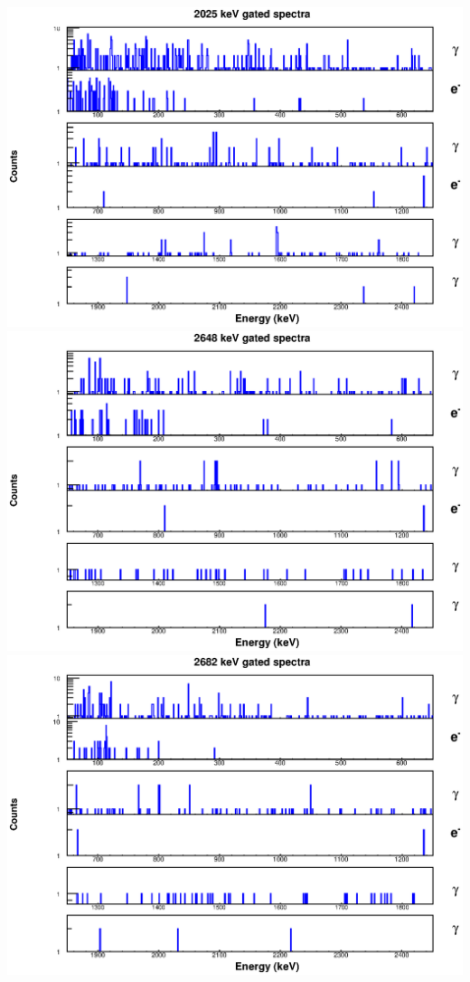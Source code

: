 \includegraphics[scale=0.8]{154Gd_Appendix/2025_combined.eps}
\includegraphics[scale=0.8]{154Gd_Appendix/2648_combined.eps}
\includegraphics[scale=0.8]{154Gd_Appendix/2682_combined.eps}
